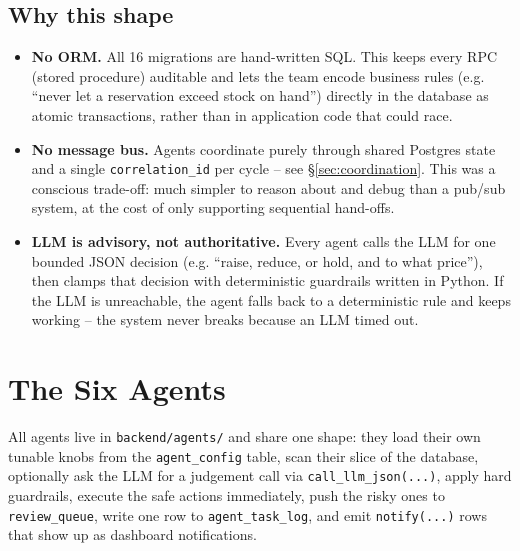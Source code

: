 \documentclass[11pt,a4paper]{article}
\begin{document}
\subsection{Why this shape}
\begin{itemize}[itemsep=2pt]
  \item \textbf{No ORM.} All 16 migrations are hand-written SQL. This keeps every RPC (stored
  procedure) auditable and lets the team encode business rules (e.g. ``never let a reservation
  exceed stock on hand'') directly in the database as atomic transactions, rather than in
  application code that could race.
  \item \textbf{No message bus.} Agents coordinate purely through shared Postgres state and
  a single \texttt{correlation\_id} per cycle -- see \S\ref{sec:coordination}. This was a
  conscious trade-off: much simpler to reason about and debug than a pub/sub system, at the
  cost of only supporting sequential hand-offs.
  \item \textbf{LLM is advisory, not authoritative.} Every agent calls the LLM for one bounded
  JSON decision (e.g. ``raise, reduce, or hold, and to what price''), then clamps that decision
  with deterministic guardrails written in Python. If the LLM is unreachable, the agent falls
  back to a deterministic rule and keeps working -- the system never breaks because an LLM
  timed out.
\end{itemize}

\section{The Six Agents}

All agents live in \texttt{backend/agents/} and share one shape: they load their own tunable
knobs from the \texttt{agent\_config} table, scan their slice of the database, optionally ask
the LLM for a judgement call via \texttt{call\_llm\_json(...)}, apply hard guardrails, execute
the safe actions immediately, push the risky ones to \texttt{review\_queue}, write one row to
\texttt{agent\_task\_log}, and emit \texttt{notify(...)} rows that show up as dashboard
notifications.
\end{document}
